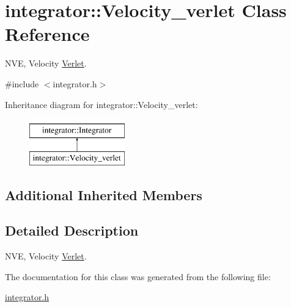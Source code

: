 \hypertarget{classintegrator_1_1Velocity__verlet}{\section{integrator\-:\-:Velocity\-\_\-verlet Class Reference}
\label{classintegrator_1_1Velocity__verlet}
}


N\-V\-E, Velocity \hyperlink{classintegrator_1_1Verlet}{Verlet}.  




{\ttfamily \#include $<$integrator.\-h$>$}

Inheritance diagram for integrator\-:\-:Velocity\-\_\-verlet\-:\begin{figure}[H]
\begin{center}
\leavevmode
\includegraphics[height=2.000000cm]{classintegrator_1_1Velocity__verlet}
\end{center}
\end{figure}
\subsection*{Additional Inherited Members}


\subsection{Detailed Description}
N\-V\-E, Velocity \hyperlink{classintegrator_1_1Verlet}{Verlet}. 

The documentation for this class was generated from the following file\-:\begin{DoxyCompactItemize}
\item 
\hyperlink{integrator_8h}{integrator.\-h}\end{DoxyCompactItemize}
